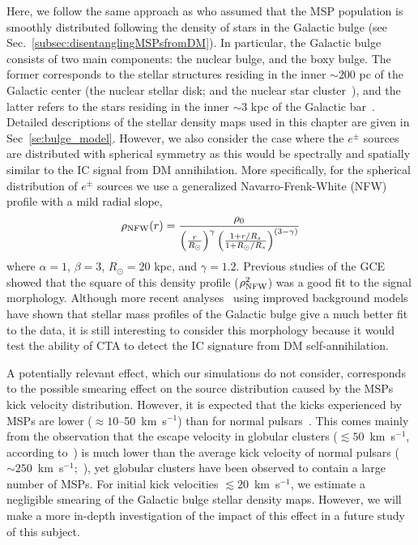 \documentclass[doublespace,nopageskip]{VTthesis} %
\begin{document}
Here, we follow the same approach as \cite{2019PhRvD..99l3020S} who assumed that the MSP population is smoothly distributed following the density of stars in the Galactic bulge (see Sec.~\ref{subsec:disentanglingMSPsfromDM}). In particular, the Galactic bulge consists of two main components: the nuclear bulge, and the boxy bulge. The former corresponds to the stellar structures residing in the inner $\sim 200$ pc of the Galactic center (the nuclear stellar disk; and the nuclear star cluster~\citealt{2002A&A...384..112L}), and the latter refers to the stars residing in the inner $\sim3$ kpc of the Galactic bar~\citep{1998ApJ...492..495F,2020MNRAS.495.3350C}. Detailed descriptions of the stellar density maps used in this chapter are given in Sec~\ref{se:bulge_model}. However, we also consider the case where the $e^\pm$ sources are distributed with spherical symmetry as this would be spectrally and spatially similar to the IC signal from DM annihilation. More specifically, for the spherical distribution of $e^\pm$ sources we use a generalized Navarro-Frenk-White (NFW) profile with a mild radial slope,
\begin{equation}\label{eq:NFW}
    \rho_{\rm NFW}(r)=\frac{\rho_{0}}{\left(\frac{r}{R_{\odot}}\right)^{\gamma}\left(\frac{1+r / R_{s}}{1+R_{\odot} / R_{s}}\right)^{(3-\gamma)}}
\end{equation}
where $\alpha=1$, $\beta=3$, $R_{\odot}=20$ kpc, and $\gamma=1.2$. Previous studies of the GCE~\citep{2012PhRvD..86h3511A,2013PhRvD..88h3521G,2016PDU....12....1D,2016ApJ...827..143C} showed that the square of this density profile ($\rho^2_{\rm NFW}$)  was a good fit to the signal morphology. Although more recent analyses~\citep{2018NatAs...2..387M,2018NatAs...2..819B,2019JCAP...09..042M,2020PhRvD.102d3012A} using improved background models have shown that stellar mass profiles of the Galactic bulge give a much better fit to the data, it is still interesting to consider this morphology because it  would test the ability of CTA to detect the IC signature from DM self-annihilation.


A potentially relevant effect, which our simulations do not consider, corresponds to the possible smearing effect on the source distribution caused by the MSPs kick velocity distribution. However, it is expected that the kicks experienced by MSPs are lower ($\approx 10$--50~km~s$^{-1}$) than for normal pulsars~\citep{2005ASPC..328..327P}. This comes mainly from the observation that the escape velocity in globular clusters ($\lesssim 50$~km~s$^{-1}$, according to~\citealt{2002ApJ...573..283P}) is much lower than the average kick velocity of normal pulsars ($\sim 250$~km~s$^{-1}$;~\citealt{2005MNRAS.360..974H,2019MNRAS.489.3116A}), yet globular clusters have been observed to contain a large number of MSPs. For initial kick velocities $\lesssim 20$~km~s$^{-1}$, we estimate a negligible smearing of the Galactic bulge stellar density maps. However, we will make a more in-depth investigation of the impact of this effect in a future study of this subject. 
\end{document}

